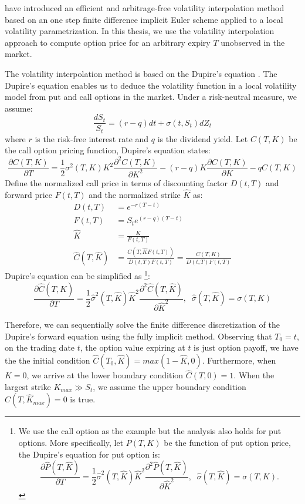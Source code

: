 \documentclass[letterpaper,12pt,titlepage,oneside,final]{book}
\numberwithin{equation}{section}
\theoremstyle{definition}
\begin{document}
\citet{andreasen2010volatility} have introduced an efficient and arbitrage-free volatility interpolation method based on an one step finite difference implicit Euler scheme applied to a local volatility parametrization. In this thesis, we use the volatility interpolation approach to compute option price for an arbitrary expiry $T$ unobserved in the market.




The volatility interpolation method is based on the Dupire's equation \cite{dupire1994pricing}.  The Dupire's equation enables us to deduce the volatility function in a local volatility
model from  put and call options in the market.
Under a risk-neutral measure, we assume:
	\[
	\frac{d S_t}{ S_t}= \left(r-q\right)dt +\sigma(t,S_t) dZ_t
	\]
where $r$ is the risk-free interest rate and $q$ is the dividend yield.
 Let $C(T,K)$ be the call option pricing function, Dupire's equation states:
	\[
	\frac{\partial C(T,K)}{\partial T}=\frac{1}{2} {\sigma}^2(T,K)K^2  \frac{\partial^2 C(T,K)}{ \partial K^2}-(r-q) K\frac{\partial C(T,K)}{\partial K}-qC(T,K)
	\]
Define the normalized call price in terms of discounting factor $D(t,T)$ and forward price $F(t,T)$ and the normalized strike $\widehat{K}$ as:
\[
\begin{split}
D(t,T)&=e^{-r(T-t)}\\
F(t,T)&=S_te^{(r-q)(T-t)}\\
\widehat{K}&=\frac{K}{F(t,T)}\\
\widehat{C}(T,\widehat{K})&=\frac{C(T,\widehat{K} F(t,T))}{D(t,T)F(t,T)}=\frac{C(T,K)}{D(t,T)F(t,T)}
\end{split}
\]
Dupire's equation can be simplified as \cite{andreasen2010volatility}\footnote{
	 We use the call option as the example but the analysis also holds for put options. More specifically, let $P(T,K)$	be the function of put option price, the Dupire's equation for put option is:
	\[
	\frac{\partial \widehat{P}(T,\widehat{K})}{\partial T}=\frac{1}{2} \widehat{\sigma}^2(T,\widehat{K}) \widehat{K}^2  \frac{\partial^2 \widehat{P}(T,\widehat{K})}{ \partial \widehat{K}^2},\;\; \widehat{\sigma}(T,\widehat{K})={\sigma}(T,K).
	\]
}:
\[
\frac{\partial \widehat{C}(T,\widehat{K})}{\partial T}=\frac{1}{2} \widehat{\sigma}^2(T,\widehat{K}) \widehat{K}^2  \frac{\partial^2 \widehat{C}(T,\widehat{K})}{ \partial \widehat{K}^2},\;\; \widehat{\sigma}(T,\widehat{K})={\sigma}(T,K)
\]

Therefore, we can sequentially solve the finite difference  discretization of the Dupire's forward equation using the fully implicit method.
Observing that $T_0=t$, on the trading date $t$, the option value expiring at $t$ is just option payoff, we have the the initial condition $\widehat{C}(T_0,\widehat{K})=max(1-\widehat{K},0)$.
Furthermore, when $K=0$, we arrive at the lower boundary condition $\widehat{C}(T,0)=1$. 
When the largest strike $K_{max}\gg S_t$, we assume the upper boundary condition $\widehat{C}(T,\widehat{K}_{max})=0$ is true. 
\end{document}
